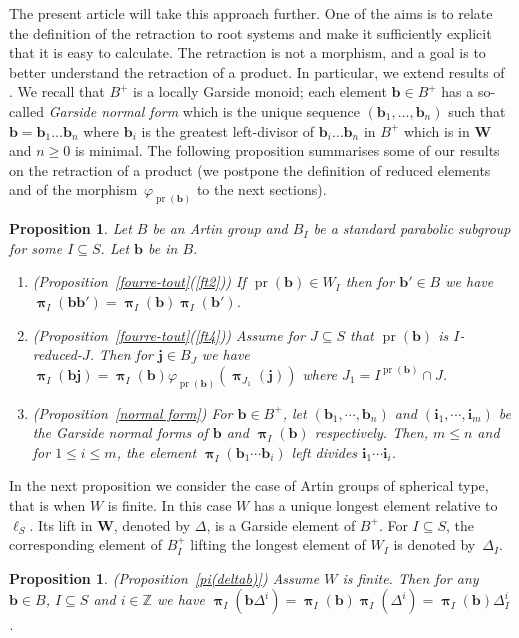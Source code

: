 \documentclass{amsart}
\numberwithin{equation}{section}
\newtheorem{proposition}[equation]{Proposition}
\newcommand\bb{{\mathbf b}}
\newcommand\bi{{\mathbf i}}
\newcommand\bj{{\mathbf j}}
\newcommand\bW{{\mathbf W}}
\newcommand\BZ{{\mathbb Z}}
\DeclareMathOperator\pr{pr}
\DeclareMathOperator\bpi{\boldsymbol\pi}
\begin{document}
The present article will
take this approach further. One of the aims is to relate the
definition of the retraction to root systems and make it sufficiently explicit
that it is easy to calculate. The retraction is not a morphism, and
a goal is to  better  understand the retraction of a
product.  In particular, we  extend results of \cite{blufstein-paris,godelle}.
We recall that $B^+$ is a locally Garside monoid; each
element  $\bb\in B^+$ has a so-called  \emph{Garside normal form} which is
the  unique sequence $(\bb_1,\ldots,\bb_n)$ such
that  $\bb=\bb_1\ldots \bb_n$ where $\bb_i$ is the greatest left-divisor of $\bb_i\ldots
\bb_{n}$ in $B^+$ which is in $\bW$ and $n\ge 0$ is minimal. The following
proposition  summarises some of our results on the retraction of a product
(we postpone the definition of reduced elements and of the
morphism~$\varphi_{\pr(\bb)}$  to  the  next  sections).
\begin{proposition} \label{propIntro1}
Let  $B$ be an Artin  group and $B_I$ be  a standard parabolic subgroup for
some $I\subseteq S$. Let $\bb$ be in $B$.
\begin{enumerate}
\item  (Proposition~\ref{fourre-tout}(\ref{ft2})) If   $\pr(\bb)\in   W_I$   then  
 for $\bb'\in B$ we have $\bpi_I(\bb\bb') =\bpi_I(\bb)\bpi_I(\bb')$.
\item   (Proposition~\ref{fourre-tout}(\ref{ft4}))  Assume  for $J\subseteq S$ that
$\pr(\bb)$  is $I$-reduced-$J$. Then for  $\bj\in B_J$ we have
$\bpi_I(\bb\bj) = \bpi_I(\bb)\varphi_{\pr(\bb)}(\bpi_{J_1}(\bj))$
where $J_1=I^{\pr(\bb)}\cap J$.
\item  (Proposition~\ref{normal form}) For $\bb\in  B^+$, let $(\bb_1,\cdots, \bb_n)$ and
$(\bi_1,\cdots,  \bi_m)$ be the Garside  normal forms of $\bb$
and $\bpi_I(\bb)$ respectively. Then, $m\leq n$ and for $1\leq i\leq m$, the element
$\bpi_I(\bb_1\cdots \bb_i)$ left divides $\bi_1\cdots\bi_i$.
\end{enumerate}
\end{proposition}

In  the next proposition we consider the  case of Artin groups of spherical
type,  that is when  $W$ is finite.  In this case  $W$ has a unique longest
element relative to~$\ell_S$. Its  lift in $\bW$, denoted by
$\Delta$, is  a  Garside  element  of  $B^+$.  For $I\subseteq S$, the
corresponding  element of $B^+_I$  lifting the longest  element of $W_I$ is
denoted by~$\Delta_I$.

\begin{proposition}  \label{propIntro2}(Proposition~\ref{pi(deltab)}) Assume $W$ is
finite. Then for any $\bb\in B$, $I\subseteq S$ and $i\in\BZ$  we have
$\bpi_I(\bb\Delta^i)=\bpi_I(\bb)\bpi_I(\Delta^i) =\bpi_I(\bb)\Delta_I^i$. 
\end{proposition}
\end{document}
